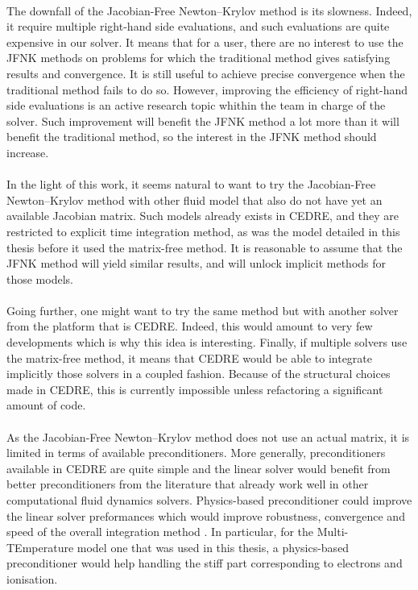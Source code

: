     \paragraph{}
    The downfall of the Jacobian-Free Newton--Krylov method is its slowness.
    Indeed, it require multiple right-hand side evaluations, and such evaluations are quite expensive in our solver.
    It means that for a user, there are no interest to use the JFNK methods on problems for which the traditional method gives satisfying results and convergence.
    It is still useful to achieve precise convergence when the traditional method fails to do so.
    However, improving the efficiency of right-hand side evaluations is an active research topic whithin the team in charge of the solver.
    Such improvement will benefit the JFNK method a lot more than it will benefit the traditional method, so the interest in the JFNK method should increase.

    \paragraph{}
    In the light of this work, it seems natural to want to try the Jacobian-Free Newton--Krylov method with other fluid model that also do not have yet an available Jacobian matrix.
    Such models already exists in CEDRE, and they are restricted to explicit time integration method, as was the model detailed in this thesis before it used the matrix-free method.
    It is reasonable to assume that the JFNK method will yield similar results, and will unlock implicit methods for those models.

    \paragraph{}
    Going further, one might want to try the same method but with another solver from the platform that is CEDRE.
    Indeed, this would amount to very few developments which is why this idea is interesting.
    Finally, if multiple solvers use the matrix-free method, it means that CEDRE would be able to integrate implicitly those solvers in a coupled fashion.
    Because of the structural choices made in CEDRE, this is currently impossible unless refactoring a significant amount of code.

    \paragraph{}
    As the Jacobian-Free Newton--Krylov method does not use an actual matrix, it is limited in terms of available preconditioners.
    More generally, preconditioners available in CEDRE are quite simple and the linear solver would benefit from better preconditioners from the literature that already work well in other computational fluid dynamics solvers.
    Physics-based preconditioner could improve the linear solver preformances which would improve robustness, convergence and speed of the overall integration method \cite{ParkNourgalievMartineauEtAl2009, LiuZhangZhongEtAl2015}.
    In particular, for the Multi-TEmperature model one that was used in this thesis, a physics-based preconditioner would help handling the stiff part corresponding to electrons and ionisation.


